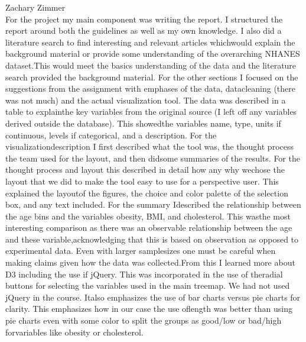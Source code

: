\documentclass[12pt]{article}
\numberwithin{figure}{section}
\begin{document}
{\sf Zachary Zimmer}\\
For the project my main component was writing the report. I structured the report around both the guidelines as well as my own knowledge. I also did a literature search to find interesting and relevant articles whichwould explain the background material or provide some understanding of the overarching NHANES dataset.This would meet the basics understanding of the data and the literature search provided the background material. For the other sections I focused on the suggestions from the assignment with emphases of the data, datacleaning (there was not much) and the actual visualization tool. The data was described in a table to explainthe key variables from the original source (I left off any variables derived outside the database). This showedthe variables name, type, units if continuous, levels if categorical, and a description. For the visualizationdescription I first described what the tool was, the thought process the team used for the layout, and then didsome summaries of the results. For the thought process and layout this described in detail how any why wechose the layout that we did to make the tool easy to use for a perspective user. This explained the layoutof the figures, the choice and color palette of the selection box, and any text included. For the summary Idescribed the relationship between the age bins and the variables obesity, BMI, and cholesterol. This wasthe most interesting comparison as there was an observable relationship between the age and these variable,acknowledging that this is based on observation as opposed to experimental data. Even with larger samplesizes one must be careful when making claims given how the data was collected.From this I learned more about D3 including the use if jQuery. This was incorporated in the use of theradial buttons for selecting the variables used in the main treemap. We had not used jQuery in the course. Italso emphasizes the use of bar charts versus pie charts for clarity. This emphasizes how in our case the use oflength was better than using pie charts even with some color to split the groups as good/low or bad/high forvariables like obesity or cholesterol.
\end{document}

